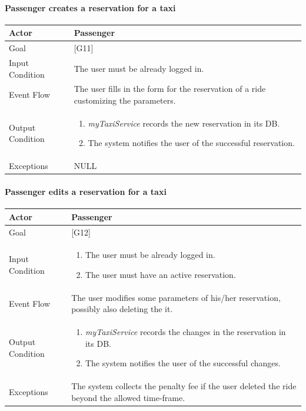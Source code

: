 \documentclass[a4paper,11pt]{report} %
\newcommand{\mts}{\mbox{\normalfont\itshape myTaxiService}}
\begin{document}
	\pagebreak
	
	\paragraph{Passenger creates a reservation for a taxi}
	\begin{center}
		\begin{tabular}{| l | p{9cm} |}\hline
			Actor & Passenger\\\hline
			Goal & {[}G11{]} \\\hline
			Input Condition & The user must be already logged in.\\\hline
			Event Flow & The user fills in the form for the reservation of a ride customizing the parameters.\\\hline
			Output Condition & \begin{enumerate}
									\item \mts{} records the new reservation in its DB.
									\item The system notifies the user of the successful reservation.
							   \end{enumerate}\\\hline
			Exceptions & NULL\\\hline
		\end{tabular}
	\end{center}
	
	\pagebreak
	
	\paragraph{Passenger edits a reservation for a taxi}
	\begin{center}
		\begin{tabular}{| l | p{9cm} |}\hline
			Actor & Passenger\\\hline
			Goal & {[}G12{]} \\\hline
			Input Condition & \begin{enumerate}
									\item The user must be already logged in.
									\item The user must have an active reservation.
							  \end{enumerate}\\\hline
			Event Flow & The user modifies some parameters of his/her reservation, possibly also deleting the it.\\\hline
			Output Condition & \begin{enumerate}
									\item \mts{} records the changes in the reservation in its DB.
									\item The system notifies the user of the successful changes.
						   	   \end{enumerate}\\\hline
			Exceptions & The system collects the penalty fee if the user deleted the ride beyond the allowed time-frame.\\\hline
		\end{tabular}
	\end{center}	
	
\end{document}
